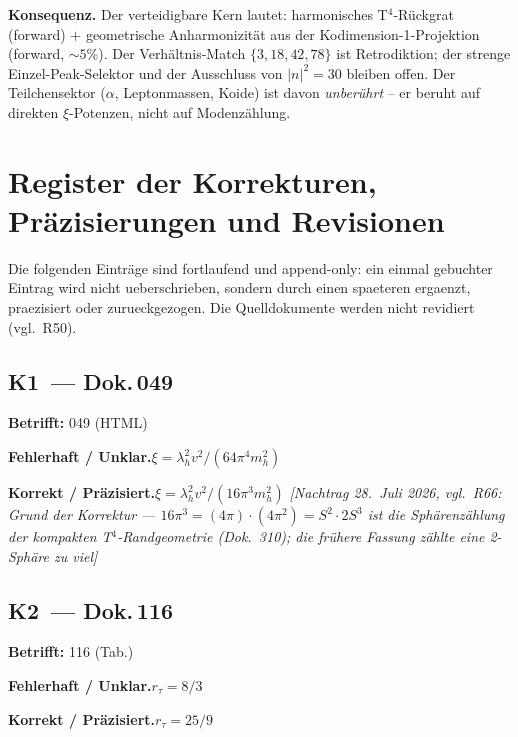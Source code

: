 \textbf{Konsequenz.} Der verteidigbare Kern lautet: harmonisches
T$^4$-Rückgrat (forward) $+$ geometrische Anharmonizität aus der
Kodimension-1-Projektion (forward, $\sim5\%$). Der Verhältnis-Match
$\{3,18,42,78\}$ ist Retrodiktion; der strenge Einzel-Peak-Selektor und der
Ausschluss von $|n|^2=30$ bleiben offen. Der Teilchensektor ($\alpha$,
Leptonmassen, Koide) ist davon \emph{unberührt} -- er beruht auf direkten
$\xi$-Potenzen, nicht auf Modenzählung.



\section{Register der Korrekturen, Präzisierungen und Revisionen}

\noindent Die folgenden Einträge sind fortlaufend und append-only: ein einmal gebuchter Eintrag wird nicht ueberschrieben, sondern durch einen spaeteren ergaenzt, praezisiert oder zurueckgezogen. Die Quelldokumente werden nicht revidiert (vgl.\ R50).


\subsection*{K1~--- Dok.\,049}

\noindent\textbf{Betrifft:} 049 (HTML)


\smallskip\noindent\textbf{Fehlerhaft / Unklar.}\quad $\xi = \lambda_h^2 v^2/(64\pi^4 m_h^2)$


\smallskip\noindent\textbf{Korrekt / Präzisiert.}\quad $\xi = \lambda_h^2 v^2/(16\pi^3 m_h^2)$ \emph{[Nachtrag 28.~Juli 2026, vgl.\ R66: Grund der Korrektur --- $16\pi^3 = (4\pi)\cdot(4\pi^2) = S^2\cdot 2S^3$ ist die Sphärenzählung der kompakten T$^4$-Randgeometrie (Dok.~310); die frühere Fassung zählte eine 2-Sphäre zu viel]}


\medskip


\subsection*{K2~--- Dok.\,116}

\noindent\textbf{Betrifft:} 116 (Tab.)


\smallskip\noindent\textbf{Fehlerhaft / Unklar.}\quad $r_\tau = 8/3$


\smallskip\noindent\textbf{Korrekt / Präzisiert.}\quad $r_\tau = 25/9$


